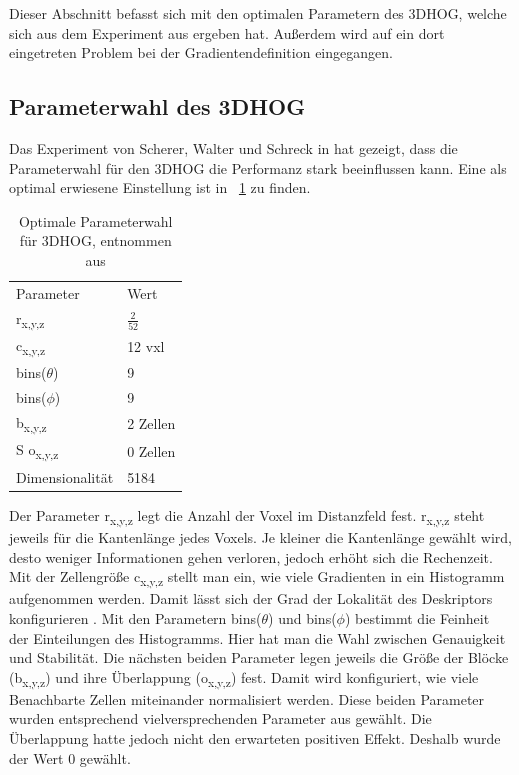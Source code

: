 Dieser Abschnitt befasst sich mit den optimalen Parametern des 3DHOG, welche sich aus dem Experiment aus \cite{scherer2010histograms} ergeben hat. Außerdem wird auf ein dort eingetreten Problem bei der Gradientendefinition eingegangen.
\subsection{Parameterwahl des 3DHOG}
Das Experiment von Scherer, Walter und Schreck in \cite{scherer2010histograms} hat gezeigt, dass die Parameterwahl für den 3DHOG die Performanz stark beeinflussen kann. Eine als optimal erwiesene Einstellung ist in \figurename~\ref{Parameter} zu finden.

\begin{table}[H]
	\centering
	\caption{Optimale Parameterwahl für 3DHOG, entnommen aus \cite{scherer2010histograms}}
	\label{Parameter}
	\begin{tabular}{ll}
		Parameter                & Wert     \\
		r\textsubscript{x,y,z} & $\frac{2}{52}$    \\
		c\textsubscript{x,y,z} & 12 vxl   \\
		bins($ \theta $)       & 9        \\
		bins($ \phi $)         & 9        \\
		b\textsubscript{x,y,z} & 2 Zellen \\S
		o\textsubscript{x,y,z} & 0 Zellen \\
		Dimensionalität          & 5184    
	\end{tabular}
	
\end{table}

Der Parameter r\textsubscript{x,y,z} legt die Anzahl der Voxel im Distanzfeld fest. r\textsubscript{x,y,z} steht jeweils für die Kantenlänge jedes Voxels. Je kleiner die Kantenlänge gewählt wird, desto weniger Informationen gehen verloren, jedoch erhöht sich die Rechenzeit. Mit der Zellengröße c\textsubscript{x,y,z} stellt man ein, wie viele Gradienten in ein Histogramm aufgenommen werden. Damit lässt sich der Grad der Lokalität des Deskriptors konfigurieren \cite{scherer2010histograms}.
Mit den Parametern 	bins($ \theta $) und bins($ \phi $) bestimmt die Feinheit der Einteilungen des Histogramms. Hier hat man die Wahl zwischen Genauigkeit und Stabilität.
Die nächsten beiden Parameter legen jeweils die Größe der Blöcke (b\textsubscript{x,y,z})  und ihre Überlappung  (o\textsubscript{x,y,z}) fest. Damit wird konfiguriert, wie viele Benachbarte Zellen miteinander normalisiert werden. Diese beiden Parameter wurden entsprechend vielversprechenden Parameter aus \cite{dalal2005histograms} gewählt. Die Überlappung hatte jedoch nicht den erwarteten positiven Effekt. Deshalb wurde der Wert 0 gewählt.


